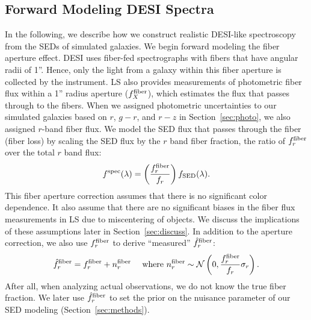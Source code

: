 \subsection{Forward Modeling DESI Spectra} \label{sec:spec}
In the following, we describe how we construct realistic DESI-like spectroscopy 
from the SEDs of simulated galaxies. 
We begin forward modeling the fiber aperture effect. %
DESI uses fiber-fed spectrographs with fibers that have angular radii of 1''. 
Hence, only the light from a galaxy within this fiber aperture is collected by
the instrument.
LS also provides measurements of photometric fiber flux within a 1'' radius aperture
($f_X^{\rm fiber}$), which estimates the flux that passes through to the fibers.
When we assigned photometric uncertainties to our simulated galaxies based on
$r$, $g-r$, and $r-z$ in Section~\ref{sec:photo}, we also assigned $r$-band
fiber flux. 
We model the SED flux that passes through the fiber (fiber loss) by scaling the 
SED flux by the $r$ band fiber fraction, the ratio of $f_r^{\rm fiber}$ over
the total $r$ band flux: 
\begin{equation}
    f^{\rm spec}(\lambda) = \left(\frac{f_r^{\rm fiber}}{f_r}\right)f_{\rm SED}(\lambda).
\end{equation}
This fiber aperture correction assumes that there is no significant color
dependence. 
It also assume that there are no significant biases in the fiber flux
measurements in LS due to miscentering of objects. 
We discuss the implications of these assumptions later in
Section~\ref{sec:discuss}. 
In addition to the aperture correction, we also use $f_r^{\rm fiber}$ to derive
``measured'' $\hat{f}_r^{\rm fiber}$: 
\begin{equation}
    \hat{f}_r^{\rm fiber} = f_r^{\rm fiber} + n^{\rm fiber}_r \quad~{\rm
    where}~n^{\rm fiber}_r \sim \mathcal{N}\left(0, \frac{f_r^{\rm fiber}}{f_r}
    \sigma_r\right).
\end{equation}
After all, when analyzing actual observations, we do not know the true fiber
fraction. 
We later use $\hat{f}_r^{\rm fiber}$ to set the prior on the nuisance parameter
of our SED modeling (Section~\ref{sec:methods}).

